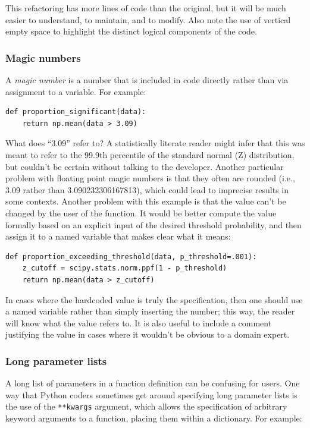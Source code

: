 This refactoring has more lines of code than the original, but it will be much easier to understand, to maintain, and to modify.
Also note the use of vertical empty space to highlight the distinct logical components of the code.

\subsubsection{Magic numbers}

A \textit{magic number} is a number that is included in code directly rather than via assignment to a variable. For example:

\begin{lstlisting}[style=Pythonshort]
def proportion_significant(data):
    return np.mean(data > 3.09)
\end{lstlisting}

What does ``3.09'' refer to? A statistically literate reader might infer that this was meant to refer to the 99.9th percentile of the standard normal (Z) distribution, but couldn't be certain without talking to the developer.
Another particular problem with floating point magic numbers is that they often are rounded (i.e., 3.09 rather than 3.090232306167813), which could lead to imprecise results in some contexts.
Another problem with this example is that the value can't be changed by the user of the function.
It would be better compute the value formally based on an explicit input of the desired threshold probability, and then assign it to a named variable that makes clear what it means:

\begin{lstlisting}[style=Pythonshort]
def proportion_exceeding_threshold(data, p_threshold=.001):
    z_cutoff = scipy.stats.norm.ppf(1 - p_threshold)
    return np.mean(data > z_cutoff)
\end{lstlisting}

In cases where the hardcoded value is truly the specification, then one should use a named variable rather than simply inserting the number; this way, the reader will know what the value refers to.  It is also useful to include a comment justifying the value in cases where it wouldn't be obvious to a domain expert.

\subsubsection{Long parameter lists}

A long list of parameters in a function definition can be confusing for users.
One way that Python coders sometimes get around specifying long parameter lists is the use of the \texttt{**kwargs} argument, which allows the specification of arbitrary keyword arguments to a function, placing them within a dictionary.
For example:

